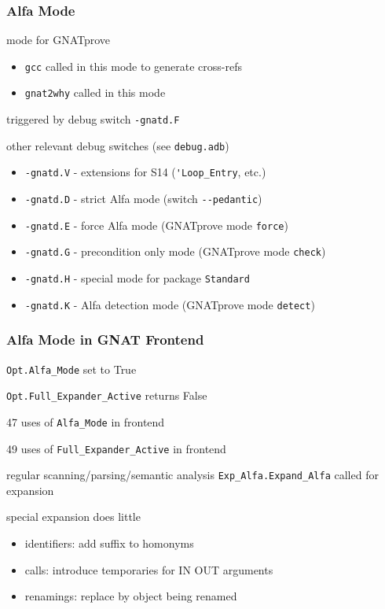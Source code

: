 \documentclass{beamer}
\newcommand{\vs}{\vspace{0.5cm}}
\newenvironment{specialframe}{%
  \begin{frame}[fragile,environment=specialframe]}{\end{frame}}
\begin{document}
\begin{specialframe}
  \frametitle{Alfa Mode}

mode for GNATprove
\begin{itemize}
\item \verb|gcc| called in this mode to generate cross-refs
\item \verb|gnat2why| called in this mode
\end{itemize}

\vs

triggered by debug switch \verb|-gnatd.F|

\vs

other relevant debug switches (see \verb|debug.adb|)
\begin{itemize}
\item \verb|-gnatd.V| - extensions for S14 (\verb|'Loop_Entry|, etc.)
\item \verb|-gnatd.D| - strict Alfa mode (switch \verb|--pedantic|)
\item \verb|-gnatd.E| - force Alfa mode (GNATprove mode \verb|force|)
\item \verb|-gnatd.G| - precondition only mode (GNATprove mode \verb|check|)
\item \verb|-gnatd.H| - special mode for package \verb|Standard|
\item \verb|-gnatd.K| - Alfa detection mode (GNATprove mode \verb|detect|)
\end{itemize}

\end{specialframe}

\begin{specialframe}
  \frametitle{Alfa Mode in GNAT Frontend}

\verb|Opt.Alfa_Mode| set to True

\verb|Opt.Full_Expander_Active| returns False

\vs

47 uses of \verb|Alfa_Mode| in frontend

49 uses of \verb|Full_Expander_Active| in frontend

\vs

regular scanning/parsing/semantic analysis
\verb|Exp_Alfa.Expand_Alfa| called for expansion

\vs

special expansion does little
\begin{itemize}
\item identifiers: add suffix to homonyms
\item calls: introduce temporaries for IN OUT arguments
\item renamings: replace by object being renamed
\end{itemize}

\end{specialframe}
\end{document}
